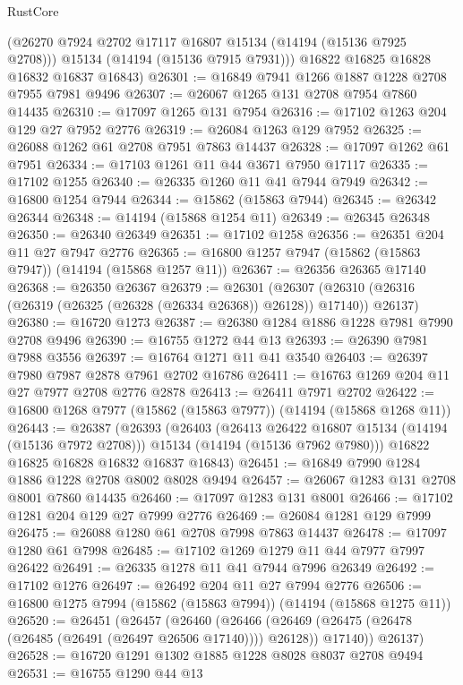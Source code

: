 \begin{lexlean}{RustCore}
\begin{coremodule}
        (@26270 @7924 @2702 @17117 @16807 @15134 (@14194 (@15136 @7925 @2708)))
        @15134
        (@14194 (@15136 @7915 @7931)))
      @16822
      @16825
      @16828
      @16832
      @16837
      @16843)
@26301 := @16849 @7941 @1266 @1887 @1228 @2708 @7955 @7981 @9496
@26307 := @26067 @1265 @131 @2708 @7954 @7860 @14435
@26310 := @17097 @1265 @131 @7954
@26316 := @17102 @1263 @204 @129 @27 @7952 @2776
@26319 := @26084 @1263 @129 @7952
@26325 := @26088 @1262 @61 @2708 @7951 @7863 @14437
@26328 := @17097 @1262 @61 @7951
@26334 := @17103 @1261 @11 @44 @3671 @7950 @17117
@26335 := @17102 @1255
@26340 := @26335 @1260 @11 @41 @7944 @7949
@26342 := @16800 @1254 @7944
@26344 := @15862 (@15863 @7944)
@26345 := @26342 @26344
@26348 := @14194 (@15868 @1254 @11)
@26349 := @26345 @26348
@26350 := @26340 @26349
@26351 := @17102 @1258
@26356 := @26351 @204 @11 @27 @7947 @2776
@26365 := @16800 @1257 @7947 (@15862 (@15863 @7947)) (@14194 (@15868 @1257 @11))
@26367 := @26356 @26365 @17140
@26368 := @26350 @26367
@26379 := @26301
    (@26307 (@26310 (@26316 (@26319 (@26325 (@26328 (@26334 @26368)) @26128)) @17140)) @26137)
@26380 := @16720 @1273
@26387 := @26380 @1284 @1886 @1228 @7981 @7990 @2708 @9496
@26390 := @16755 @1272 @44 @13
@26393 := @26390 @7981 @7988 @3556
@26397 := @16764 @1271 @11 @41 @3540
@26403 := @26397 @7980 @7987 @2878 @7961 @2702 @16786
@26411 := @16763 @1269 @204 @11 @27 @7977 @2708 @2776 @2878
@26413 := @26411 @7971 @2702
@26422 := @16800 @1268 @7977 (@15862 (@15863 @7977)) (@14194 (@15868 @1268 @11))
@26443 := @26387
    (@26393
      (@26403
        (@26413 @26422 @16807 @15134 (@14194 (@15136 @7972 @2708)))
        @15134
        (@14194 (@15136 @7962 @7980)))
      @16822
      @16825
      @16828
      @16832
      @16837
      @16843)
@26451 := @16849 @7990 @1284 @1886 @1228 @2708 @8002 @8028 @9494
@26457 := @26067 @1283 @131 @2708 @8001 @7860 @14435
@26460 := @17097 @1283 @131 @8001
@26466 := @17102 @1281 @204 @129 @27 @7999 @2776
@26469 := @26084 @1281 @129 @7999
@26475 := @26088 @1280 @61 @2708 @7998 @7863 @14437
@26478 := @17097 @1280 @61 @7998
@26485 := @17102 @1269 @1279 @11 @44 @7977 @7997 @26422
@26491 := @26335 @1278 @11 @41 @7944 @7996 @26349
@26492 := @17102 @1276
@26497 := @26492 @204 @11 @27 @7994 @2776
@26506 := @16800 @1275 @7994 (@15862 (@15863 @7994)) (@14194 (@15868 @1275 @11))
@26520 := @26451
    (@26457
      (@26460
        (@26466 (@26469 (@26475 (@26478 (@26485 (@26491 (@26497 @26506 @17140)))) @26128)) @17140))
      @26137)
@26528 := @16720 @1291 @1302 @1885 @1228 @8028 @8037 @2708 @9494
@26531 := @16755 @1290 @44 @13

\end{coremodule}
\end{lexlean}

